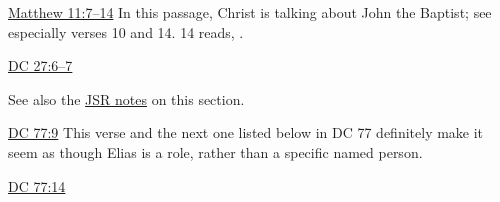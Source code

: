 		\begin{compactdesc}
			\item[{\hyperref[LCHRIST-088-MT]{Matthew 11:7--14}}] In this passage, Christ is talking about John the Baptist; see especially verses 10 and 14. 14 reads, .
			\item[{\hyperref[DC27-6]{DC 27:6--7}}]
				\begin{compactitem}
					\item See also the \hyperref[EXSS-DC27-JSR]{JSR notes} on this section.
				\end{compactitem}
			\item[{\hyperref[DC77-9]{DC 77:9}}] This verse and the next one listed below in DC 77 definitely make it seem as though Elias is a role, rather than a specific named person.
			\item[{\hyperref[DC77-14]{DC 77:14}}]
		\end{compactdesc} 
